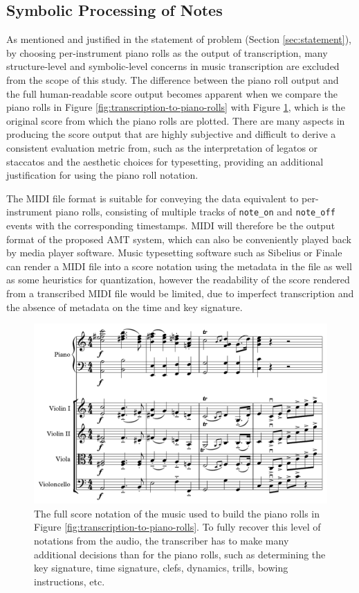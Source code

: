 \subsection{Symbolic Processing of Notes}

As mentioned and justified in the statement of problem (Section \ref{sec:statement}), by choosing per-instrument piano rolls as the output of transcription, many structure-level and symbolic-level concerns in music transcription are excluded from the scope of this study.
The difference between the piano roll output and the full human-readable score output becomes apparent when we compare the piano rolls in Figure \ref{fig:transcription-to-piano-rolls} with Figure \ref{fig:wedding-march-score}, which is the original score from which the piano rolls are plotted.
There are many aspects in producing the score output that are highly subjective and difficult to derive a consistent evaluation metric from, such as the interpretation of legatos or staccatos and the aesthetic choices for typesetting, providing an additional justification for using the piano roll notation.


The MIDI file format is suitable for conveying the data equivalent to per-instrument piano rolls, consisting of multiple tracks of \texttt{note\_on} and \texttt{note\_off} events with the corresponding timestamps.
MIDI will therefore be the output format of the proposed AMT system, which can also be conveniently played back by media player software.
Music typesetting software such as Sibelius or Finale can render a MIDI file into a score notation using the metadata in the file as well as some heuristics for quantization, however the readability of the score rendered from a transcribed MIDI file would be limited, due to imperfect transcription and the absence of metadata on the time and key signature.


\begin{figure}
	\includegraphics[width=\textwidth]{march-score.pdf}
	\caption{The full score notation of the music used to build the piano rolls in Figure \ref{fig:transcription-to-piano-rolls}. To fully recover this level of notations from the audio, the transcriber has to make many additional decisions than for the piano rolls, such as determining the key signature, time signature, clefs, dynamics, trills, bowing instructions, etc.}\label{fig:wedding-march-score}
\end{figure}



